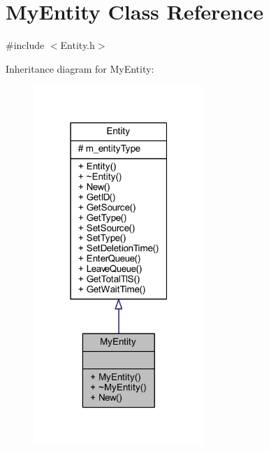 \hypertarget{class_my_entity}{}\section{My\+Entity Class Reference}
\label{class_my_entity}


{\ttfamily \#include $<$Entity.\+h$>$}



Inheritance diagram for My\+Entity\+:\nopagebreak
\begin{figure}[H]
\begin{center}
\leavevmode
\includegraphics[width=183pt]{class_my_entity__inherit__graph}
\end{center}
\end{figure}


